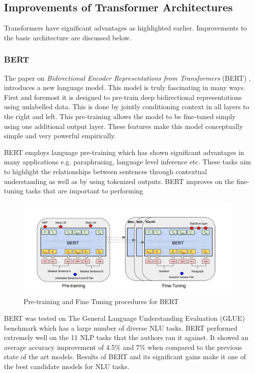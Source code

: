 \documentclass[a4paper,12pt]{report}
\begin{document}
		\subsection{Improvements of Transformer Architectures}\label{232}

            Transformers have significant advantages as highlighted earlier. Improvements to the basic architecture are discussed below.
		\subsubsection{BERT}\label{2321}

			The paper on \textit{Bidirectional Encoder Representations from Transformers} (BERT) \citep{bert}, introduces a new language model. This model is truly fascinating in many ways. First and foremost it is designed to pre-train deep bidirectional representations using unlabelled data. This is done by jointly conditioning context in all layers to the right and left. This pre-training allows the model to be fine-tuned simply using one additional output layer. These features make this model conceptually simple and very powerful empirically.

			BERT employs language pre-training \citep{dai, deepContextualized, radford2018improving} which has shown significant advantages in many applications e.g. paraphrasing, language level inference etc. These tasks aim to highlight the relationships between sentences through contextual understanding as well as by using tokenized outputs. BERT improves on the fine-tuning tasks that are important to performing
			\begin{figure}[h!]
				\centering
				\includegraphics[scale=0.35]{../images/BERT.png}
				\caption{Pre-training and Fine Tuning procedures for BERT \citep{bert}}\label{bertPretraining}
			\end{figure}

			BERT was tested on The General Language Understanding Evaluation (GLUE) benchmark \citep{wang} which has a large number of diverse NLU tasks.
			BERT performed extremely well on the 11 NLP tasks that the authors ran it against. It showed an average accuracy improvement of 4.5\% and 7\% when compared to the previous state of the art models. Results of BERT and its significant gains make it one of the best candidate models for NLU tasks.
\end{document}
